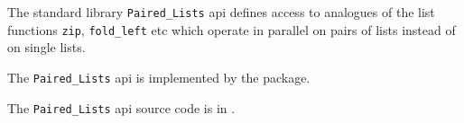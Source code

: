 
The standard library {\tt Paired\_Lists} api defines access to 
analogues of the list functions {\tt zip}, {\tt fold\_left} etc which operate in parallel 
on pairs of lists instead of on single lists.

The {\tt Paired\_Lists} api is implemented by the  package.

The {\tt Paired\_Lists} api source code is in .


